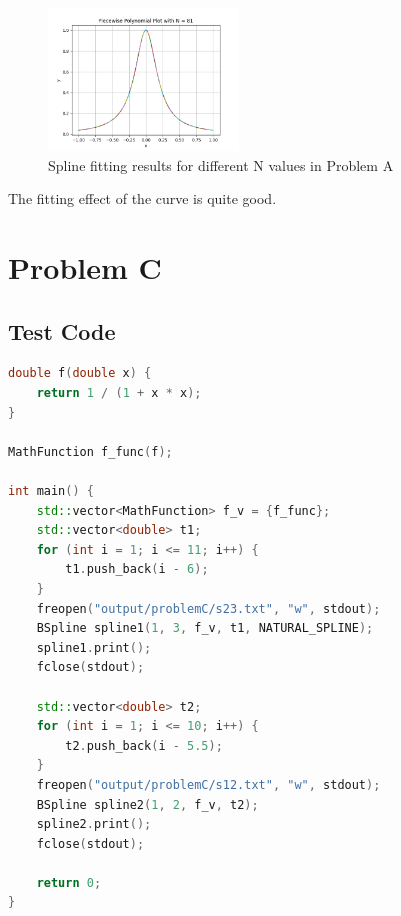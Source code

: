 \documentclass[a4paper]{article}
\begin{document}
\begin{figure}[H]
    \includegraphics[width=0.45\textwidth]{./figure/problemA/N_81.png}
    \caption{Spline fitting results for different N values in Problem A}
\end{figure}

The fitting effect of the curve is quite good.

\section{Problem C}

\subsection{Test Code}

\begin{lstlisting}[language=C++]
double f(double x) {
    return 1 / (1 + x * x);
}

MathFunction f_func(f);

int main() {
    std::vector<MathFunction> f_v = {f_func};
    std::vector<double> t1;
    for (int i = 1; i <= 11; i++) {
        t1.push_back(i - 6);
    }
    freopen("output/problemC/s23.txt", "w", stdout);
    BSpline spline1(1, 3, f_v, t1, NATURAL_SPLINE);
    spline1.print();
    fclose(stdout);

    std::vector<double> t2;
    for (int i = 1; i <= 10; i++) {
        t2.push_back(i - 5.5);
    }
    freopen("output/problemC/s12.txt", "w", stdout);
    BSpline spline2(1, 2, f_v, t2);
    spline2.print();
    fclose(stdout);

    return 0;
}
\end{lstlisting}
\end{document}
